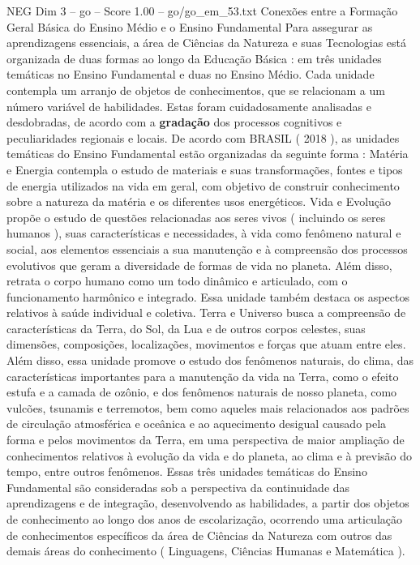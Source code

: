 \begin{textsample}{NEG Dim 3 – go – Score 1.00 – go/go\_em\_53.txt}  \label{ex:f3_neg_248}
Conexões entre a Formação Geral Básica do Ensino Médio e o Ensino Fundamental Para assegurar as aprendizagens essenciais, a área de Ciências da Natureza e suas Tecnologias está organizada de duas formas ao longo da Educação Básica : em três unidades temáticas no Ensino Fundamental e duas no Ensino Médio.
Cada unidade contempla um arranjo de objetos de conhecimentos, que se relacionam a um número variável de habilidades.
Estas foram cuidadosamente analisadas e desdobradas, de acordo com a \textbf{gradação} dos processos cognitivos e peculiaridades regionais e locais.
De acordo com BRASIL ( 2018 ), as unidades temáticas do Ensino Fundamental estão organizadas da seguinte forma : Matéria e Energia contempla o estudo de materiais e suas transformações, fontes e tipos de energia utilizados na vida em geral, com objetivo de construir conhecimento sobre a natureza da matéria e os diferentes usos energéticos.
Vida e Evolução propõe o estudo de questões relacionadas aos seres vivos ( incluindo os seres humanos ), suas características e necessidades, à vida como fenômeno natural e social, aos elementos essenciais a sua manutenção e à compreensão dos processos evolutivos que geram a diversidade de formas de vida no planeta.
Além disso, retrata o corpo humano como um todo dinâmico e articulado, com o funcionamento harmônico e integrado.
Essa unidade também destaca os aspectos relativos à saúde individual e coletiva.
Terra e Universo busca a compreensão de características da Terra, do Sol, da Lua e de outros corpos celestes, suas dimensões, composições, localizações, movimentos e forças que atuam entre eles.
Além disso, essa unidade promove o estudo dos fenômenos naturais, do clima, das características importantes para a manutenção da vida na Terra, como o efeito estufa e a camada de ozônio, e dos fenômenos naturais de nosso planeta, como vulcões, tsunamis e terremotos, bem como aqueles mais relacionados aos padrões de circulação atmosférica e oceânica e ao aquecimento desigual causado pela forma e pelos movimentos da Terra, em uma perspectiva de maior ampliação de conhecimentos relativos à evolução da vida e do planeta, ao clima e à previsão do tempo, entre outros fenômenos.
Essas três unidades temáticas do Ensino Fundamental são consideradas sob a perspectiva da continuidade das aprendizagens e de integração, desenvolvendo as habilidades, a partir dos objetos de conhecimento ao longo dos anos de escolarização, ocorrendo uma articulação de conhecimentos específicos da área de Ciências da Natureza com outros das demais áreas do conhecimento ( Linguagens, Ciências Humanas e Matemática ).

\end{textsample}
